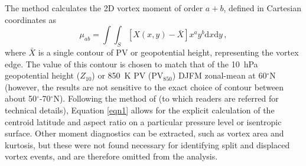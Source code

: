 The method calculates the 2D vortex moment of order $a+b$, defined in Cartesian
coordinates as
 \begin{equation}
 \mu_{ab} = \int \!\!\! \int_{S}[X(x,y) - \bar{X}]x^{a}y^{b}\mathrm{d}x\mathrm{d}y \, , 
 \label{eqn1}
 \end{equation}
 where $\bar{X}$ is a single contour of PV or geopotential height, representing
 the vortex edge. The value of this contour is chosen to match that of the
 10~hPa geopotential height ($Z_{10}$) or 850~K PV (PV$_{850}$) DJFM zonal-mean
 at 60$^{\circ}$N (however, the results are not sensitive to the exact choice of
 contour between about 50$^{\circ}$-70$^{\circ}$N). Following the method of
 \citet{Matthewman2009} (to which readers are referred for technical details),
 Equation \ref{eqn1} allows for the explicit calculation of the centroid
 latitude and aspect ratio on a particular pressure level or isentropic
 surface. Other moment diagnostics can be extracted, such as vortex area and
 kurtosis, but these were not found necessary for identifying split and
 displaced vortex events, and are therefore omitted from the
 analysis. %

